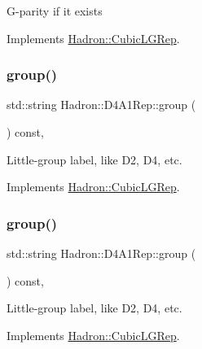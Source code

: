 G-\/parity if it exists 

Implements \mbox{\hyperlink{structHadron_1_1CubicLGRep_ace26f7b2d55e3a668a14cb9026da5231}{Hadron\+::\+Cubic\+L\+G\+Rep}}.

\mbox{\label{structHadron_1_1D4A1Rep_a53f15be3789b2544092cd724838cbac8}} 
\subsubsection{\texorpdfstring{group()}{group()}\hspace{0.1cm}{\footnotesize\ttfamily [1/3]}}
{\footnotesize\ttfamily std\+::string Hadron\+::\+D4\+A1\+Rep\+::group (\begin{DoxyParamCaption}{ }\end{DoxyParamCaption}) const\hspace{0.3cm}{\ttfamily [inline]}, {\ttfamily [virtual]}}

Little-\/group label, like D2, D4, etc. 

Implements \mbox{\hyperlink{structHadron_1_1CubicLGRep_a9bdb14b519a611d21379ed96a3a9eb41}{Hadron\+::\+Cubic\+L\+G\+Rep}}.

\mbox{\label{structHadron_1_1D4A1Rep_a53f15be3789b2544092cd724838cbac8}} 
\subsubsection{\texorpdfstring{group()}{group()}\hspace{0.1cm}{\footnotesize\ttfamily [2/3]}}
{\footnotesize\ttfamily std\+::string Hadron\+::\+D4\+A1\+Rep\+::group (\begin{DoxyParamCaption}{ }\end{DoxyParamCaption}) const\hspace{0.3cm}{\ttfamily [inline]}, {\ttfamily [virtual]}}

Little-\/group label, like D2, D4, etc. 

Implements \mbox{\hyperlink{structHadron_1_1CubicLGRep_a9bdb14b519a611d21379ed96a3a9eb41}{Hadron\+::\+Cubic\+L\+G\+Rep}}.

\mbox{\label{structHadron_1_1D4A1Rep_a53f15be3789b2544092cd724838cbac8}} 
